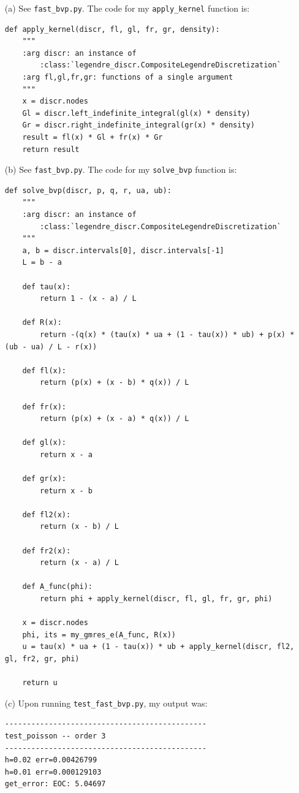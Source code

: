 \documentclass[10pt]{article}
\begin{document}
\begin{itemize}

\item[(a)] See \verb+fast_bvp.py+. The code for my \verb+apply_kernel+ function is: \begin{lstlisting}
def apply_kernel(discr, fl, gl, fr, gr, density):
    """
    :arg discr: an instance of
        :class:`legendre_discr.CompositeLegendreDiscretization`
    :arg fl,gl,fr,gr: functions of a single argument
    """
    x = discr.nodes
    Gl = discr.left_indefinite_integral(gl(x) * density)
    Gr = discr.right_indefinite_integral(gr(x) * density)
    result = fl(x) * Gl + fr(x) * Gr
    return result
\end{lstlisting}

\item[(b)] See \verb+fast_bvp.py+. The code for my \verb+solve_bvp+ function is:\begin{lstlisting}
def solve_bvp(discr, p, q, r, ua, ub):
    """
    :arg discr: an instance of
        :class:`legendre_discr.CompositeLegendreDiscretization`
    """
    a, b = discr.intervals[0], discr.intervals[-1]
    L = b - a

    def tau(x):
        return 1 - (x - a) / L

    def R(x):
        return -(q(x) * (tau(x) * ua + (1 - tau(x)) * ub) + p(x) * (ub - ua) / L - r(x))

    def fl(x):
        return (p(x) + (x - b) * q(x)) / L

    def fr(x):
        return (p(x) + (x - a) * q(x)) / L

    def gl(x):
        return x - a

    def gr(x):
        return x - b

    def fl2(x):
        return (x - b) / L

    def fr2(x):
        return (x - a) / L

    def A_func(phi):
        return phi + apply_kernel(discr, fl, gl, fr, gr, phi)

    x = discr.nodes
    phi, its = my_gmres_e(A_func, R(x))
    u = tau(x) * ua + (1 - tau(x)) * ub + apply_kernel(discr, fl2, gl, fr2, gr, phi)

    return u
\end{lstlisting}

\item[(c)] Upon running \verb+test_fast_bvp.py+, my output was: \begin{verbatim}
----------------------------------------------
test_poisson -- order 3
----------------------------------------------
h=0.02 err=0.00426799
h=0.01 err=0.000129103
get_error: EOC: 5.04697


\end{verbatim}
\end{itemize}
\end{document}
